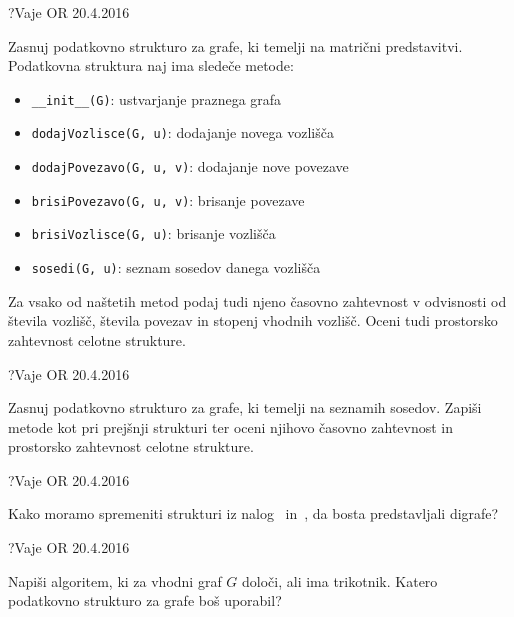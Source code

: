 
\begin{naloga}{?}{Vaje OR 20.4.2016}
\begin{vprasanje}[matgraf]
Zasnuj podatkovno strukturo za grafe,
ki temelji na matrični predstavitvi.
Podatkovna struktura naj ima sledeče metode:
\begin{itemize}
\item {\tt \_\_init\_\_(G)}: ustvarjanje praznega grafa
\item {\tt dodajVozlisce(G, u)}: dodajanje novega vozlišča
\item {\tt dodajPovezavo(G, u, v)}: dodajanje nove povezave
\item {\tt brisiPovezavo(G, u, v)}: brisanje povezave
\item {\tt brisiVozlisce(G, u)}: brisanje vozlišča
\item {\tt sosedi(G, u)}: seznam sosedov danega vozlišča
\end{itemize}
Za vsako od naštetih metod podaj tudi njeno časovno zahtevnost
v odvisnosti od števila vozlišč, števila povezav in stopenj vhodnih vozlišč.
Oceni tudi prostorsko zahtevnost celotne strukture.
\end{vprasanje}
\begin{odgovor}
\end{odgovor}
\end{naloga}


\begin{naloga}{?}{Vaje OR 20.4.2016}
\begin{vprasanje}[sosgraf]
Zasnuj podatkovno strukturo za grafe,
ki temelji na seznamih sosedov.
Zapiši metode kot pri prejšnji strukturi
ter oceni njihovo časovno zahtevnost
in prostorsko zahtevnost celotne strukture.
\end{vprasanje}
\begin{odgovor}
\end{odgovor}
\end{naloga}


\begin{naloga}{?}{Vaje OR 20.4.2016}
\begin{vprasanje}[digraf]
Kako moramo spremeniti strukturi
iz nalog~ in~,
da bosta predstavljali digrafe?
\end{vprasanje}
\begin{odgovor}
\end{odgovor}
\end{naloga}


\begin{naloga}{?}{Vaje OR 20.4.2016}
\begin{vprasanje}[trikotnik]
Napiši algoritem, ki za vhodni graf $G$ določi, ali ima trikotnik.
Katero podatkovno strukturo za grafe boš uporabil?
\end{vprasanje}
\begin{odgovor}
\end{odgovor}
\end{naloga}


